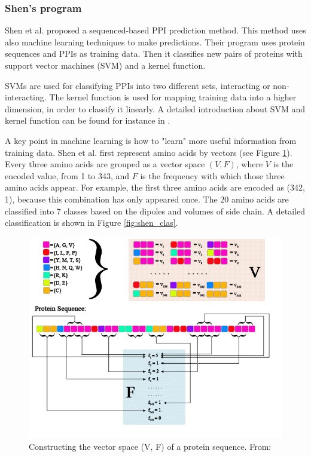 \subsubsection{Shen's program}
Shen et al. \cite{Shen07_PPIpred} proposed a sequenced-based PPI prediction method. This method uses also machine learning techniques to make predictions. Their program uses protein sequences and PPIs as training data. Then it classifies new pairs of proteins with support vector machines (SVM) and a kernel function.

SVMs are used for classifying PPIs into two different sets, interacting or non-interacting. The kernel function is used for mapping training data into a higher dimension, in order to classify it linearly. A detailed introduction about SVM and kernel function can be found for instance in \cite{trevor2001elements}.

A key point in machine learning is how to "learn" more useful information from training data. Shen et al. first represent amino acids by vectors (see Figure \ref{fig:shen}). Every three amino acids are grouped as a vector space $(V, F)$, where $V$ is the encoded value, from 1 to 343, and $F$ is the frequency with which those three amino acids appear. For example, the first three amino acids are encoded as (342, 1), because this combination has only appeared once. The 20 amino acids are classified into 7 classes based on the dipoles and volumes of side chain. A detailed classification is shown in Figure \ref{fig:shen_clas}.
\begin{figure}[h!]
\begin{center}
\includegraphics[height =13 cm, width = 13cm]{img/C_3_encode.jpg}
\caption{Constructing the vector space (V, F) of a protein sequence. From: \cite{Shen07_PPIpred} \label{fig:shen}}
\end{center}
\end{figure}

